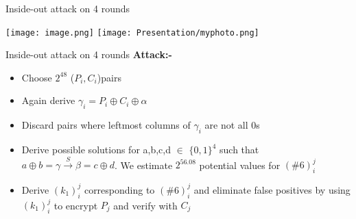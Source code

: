 \begin{frame}{Inside-out attack on 4 rounds}
\begin{center}
    \texttt{[image: image.png]}
    \texttt{[image: Presentation/myphoto.png]}
\end{center}
    
\end{frame}
\begin{frame}{Inside-out attack on 4 rounds}
\textbf{Attack:-}
\begin{itemize}
    \item Choose $2^{48}$ ($P_i,C_i$)pairs
    \item Again derive $\gamma_i = P_i\oplus C_i \oplus \alpha$
    \item Discard pairs where leftmost columns of $\gamma_i$ are not all 0s
    \item Derive possible solutions for a,b,c,d $\in$ $\{0,1\}^{4}$ such that $a\oplus b= \gamma \xrightarrow{S}\beta=c\oplus d$. We estimate $2^{56.08}$ potential values for $(\#6)^j_i$
    \item Derive $(k_1)^j_i$ corresponding to $(\#6)^j_i$ and eliminate false positives by using $(k_1)^j_i$ to encrypt $P_j$ and verify with $C_j$
\end{itemize}
    
\end{frame}
